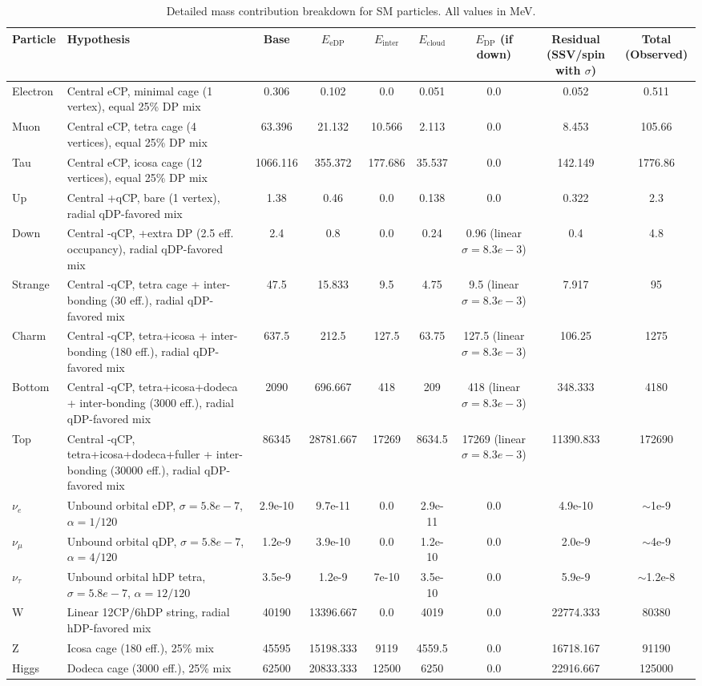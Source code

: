 \documentclass{article}
\begin{document}
\begin{landscape}
\begin{longtable}{l p{4.5cm} c c c c c c c}
\caption{Detailed mass contribution breakdown for SM particles. All values in MeV.}\\
\toprule
Particle & Hypothesis & Base & $E_{\text{eDP}}$ & $E_{\text{inter}}$ & $E_{\text{cloud}}$ & $E_{\text{DP}}$ (if down) & Residual (SSV/spin with $\sigma$) & Total (Observed) \\
\midrule
Electron & Central eCP, minimal cage (1 vertex), equal 25\% DP mix & 0.306 & 0.102 & 0.0 & 0.051 & 0.0 & 0.052 & 0.511 \\
Muon & Central eCP, tetra cage (4 vertices), equal 25\% DP mix & 63.396 & 21.132 & 10.566 & 2.113 & 0.0 & 8.453 & 105.66 \\
Tau & Central eCP, icosa cage (12 vertices), equal 25\% DP mix & 1066.116 & 355.372 & 177.686 & 35.537 & 0.0 & 142.149 & 1776.86 \\
Up & Central +qCP, bare (1 vertex), radial qDP-favored mix & 1.38 & 0.46 & 0.0 & 0.138 & 0.0 & 0.322 & 2.3 \\
Down & Central -qCP, +extra DP (2.5 eff. occupancy), radial qDP-favored mix & 2.4 & 0.8 & 0.0 & 0.24 & 0.96 (linear $\sigma=8.3e-3$) & 0.4 & 4.8 \\
Strange & Central -qCP, tetra cage + inter-bonding (30 eff.), radial qDP-favored mix & 47.5 & 15.833 & 9.5 & 4.75 & 9.5 (linear $\sigma=8.3e-3$) & 7.917 & 95 \\
Charm & Central -qCP, tetra+icosa + inter-bonding (180 eff.), radial qDP-favored mix & 637.5 & 212.5 & 127.5 & 63.75 & 127.5 (linear $\sigma=8.3e-3$) & 106.25 & 1275 \\
Bottom & Central -qCP, tetra+icosa+dodeca + inter-bonding (3000 eff.), radial qDP-favored mix & 2090 & 696.667 & 418 & 209 & 418 (linear $\sigma=8.3e-3$) & 348.333 & 4180 \\
Top & Central -qCP, tetra+icosa+dodeca+fuller + inter-bonding (30000 eff.), radial qDP-favored mix & 86345 & 28781.667 & 17269 & 8634.5 & 17269 (linear $\sigma=8.3e-3$) & 11390.833 & 172690 \\
$\nu_e$ & Unbound orbital eDP, $\sigma=5.8e-7$, $\alpha=1/120$ & 2.9e-10 & 9.7e-11 & 0.0 & 2.9e-11 & 0.0 & 4.9e-10 & $\sim$1e-9 \\
$\nu_\mu$ & Unbound orbital qDP, $\sigma=5.8e-7$, $\alpha=4/120$ & 1.2e-9 & 3.9e-10 & 0.0 & 1.2e-10 & 0.0 & 2.0e-9 & $\sim$4e-9 \\
$\nu_\tau$ & Unbound orbital hDP tetra, $\sigma=5.8e-7$, $\alpha=12/120$ & 3.5e-9 & 1.2e-9 & 7e-10 & 3.5e-10 & 0.0 & 5.9e-9 & $\sim$1.2e-8 \\
W & Linear 12CP/6hDP string, radial hDP-favored mix & 40190 & 13396.667 & 0.0 & 4019 & 0.0 & 22774.333 & 80380 \\
Z & Icosa cage (180 eff.), 25\% mix & 45595 & 15198.333 & 9119 & 4559.5 & 0.0 & 16718.167 & 91190 \\
Higgs & Dodeca cage (3000 eff.), 25\% mix & 62500 & 20833.333 & 12500 & 6250 & 0.0 & 22916.667 & 125000 \\
\bottomrule
\end{longtable}


\end{landscape}
\end{document}
